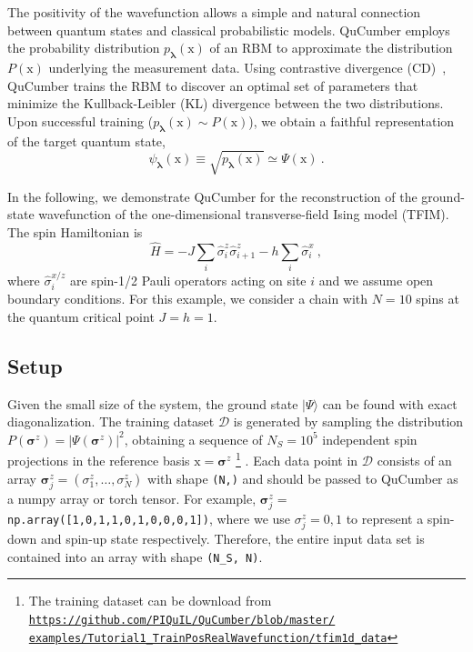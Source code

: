 \documentclass[submission, Phys, hidelnks]{SciPost}
\newcommand{\x}{\bm{\mathrm{x}}}
\begin{document}
The positivity of the wavefunction allows a simple and natural connection
between quantum states and classical probabilistic models. QuCumber employs the
probability distribution $p_{\bm{\lambda}}(\x)$ of an RBM to approximate the
distribution $P(\x)$ underlying the measurement data. Using contrastive
divergence (CD)~\cite{hinton2002training}, QuCumber trains the RBM to discover
an optimal set of parameters that minimize the Kullback-Leibler (KL) divergence
between the two distributions. Upon successful training
($p_{\bm{\lambda}}(\x)\sim P(\x)$), we obtain a faithful representation of
the target quantum state,
\begin{equation}\label{wfpd}
    \psi_{\bm{\lambda}}(\x) \equiv \sqrt{p_{\bm{\lambda}}(\x)}
    \simeq\Psi(\x)\:.
\end{equation}

In the following, we demonstrate QuCumber for the reconstruction of the
ground-state wavefunction of the one-dimensional transverse-field Ising model
(TFIM). The spin Hamiltonian is
\begin{equation}
    \hat{H} = -J\sum_i \hat{\sigma}^z_i \hat{\sigma}^z_{i+1} - h \sum_i\hat{\sigma}^x_i\:, \label{TFIM}
\end{equation}
where $\hat{\sigma}^{x/z}_i$ are spin-1/2 Pauli operators acting on site $i$
and we assume open boundary conditions. For this example, we consider a chain
with $N=10$ spins at the quantum critical point $J=h=1$.

\subsection{Setup}\label{subsec:example}
Given the small size of the system, the ground state $|\Psi\rangle$ can be found
with exact diagonalization. The training dataset $\mathcal{D}$ is generated by
sampling the distribution $P(\bm{\sigma}^z)=|\Psi(\bm{\sigma}^z)|^2$, obtaining
a sequence of $N_S=10^5$ independent spin projections in the reference basis
$\x = \bm{\sigma}^z$
\footnote{The training dataset can be download from
    \href{https://github.com/PIQuIL/QuCumber/blob/master/examples/Tutorial1_TrainPosRealWavefunction/tfim1d_data.txt}{\texttt{https://github.com/PIQuIL/QuCumber/blob/master/\\examples/Tutorial1\_TrainPosRealWavefunction/tfim1d\_data}}
}
. Each data point in $\mathcal{D}$ consists of an array $\bm{\sigma}^z_j=(\sigma^z_1,\dots,\sigma^z_N)$ with shape \verb|(N,)| and should be passed to QuCumber as a numpy array or torch tensor. For example, $\bm{\sigma}^z_j=$ \verb|np.array([1,0,1,1,0,1,0,0,0,1])|, where we use $\sigma_j^z=0,1$ to represent a spin-down and spin-up state respectively. Therefore, the entire input data set is contained into an array with shape \verb|(N_S, N)|.
\end{document}
